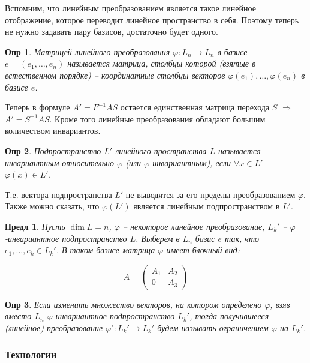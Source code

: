\documentclass[a4paper,12pt]{article}
\newtheorem*{definition}{Опр}
\newtheorem{propos}{Предл}[section]
\begin{document}
Вспомним, что линейным преобразованием является такое линейное отображение, которое переводит линейное пространство в себя. Поэтому теперь не нужно задавать пару базисов, достаточно будет одного.

\begin{definition}
	Матрицей линейного преобразования $\varphi : L_n \to L_n$ в базисе $e = (e_1, \ldots, e_n)$ называется матрица, столбцы которой (взятые в естественном порядке) -- координатные столбцы векторов $\varphi(e_1), \ldots, \varphi(e_n)$ в базисе $e$.
\end{definition}
	
Теперь в формуле $A' = F^{-1} A S$ остается единственная матрица перехода $S$ $\Rightarrow$ $A' = S^{-1} A S$. Кроме того линейные преобразования обладают большим количеством инвариантов.

\begin{definition}
	Подпространство $L'$ линейного пространства $L$ называется инвариантным относительно $\varphi$ (или $\varphi$-инвариантным), если $\forall x \in L'$ $\varphi(x) \in L'$.
\end{definition}

Т.е. вектора подпространства $L'$ не выводятся за его пределы преобразованием $\varphi$. Также можно сказать, что $\varphi(L')$ является линейным подпространством в $L'$.

\begin{propos}
	Пусть $\dim L = n$, $\varphi$ -- некоторое линейное преобразование, $L_k'$ -- $\varphi$-инвариантное подпространство $L$. Выберем в $L_n$ базис $e$ так, что $e_1, \ldots, e_k \in L_k'$. В таком базисе матрица $\varphi$ имеет блочный вид:
	
	\[
		A = \begin{pmatrix}
			A_1 & A_2 \\
			0 & A_3 
		\end{pmatrix}
	\]
\end{propos}

\begin{definition}
	Если изменить множество векторов, на котором определено $\varphi$, взяв вместо $L_n$ $\varphi$-инвариантное подпространство $L_k'$, тогда получившееся (линейное) преобразование $\varphi': L_k' \to L_k'$ будем называть ограничением $\varphi$ на $L_k'$.
\end{definition}

\subsubsection{Технологии}
\end{document}
